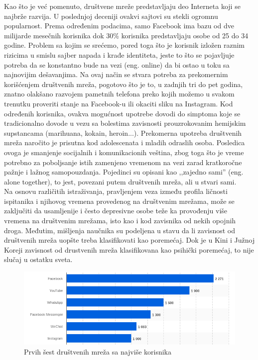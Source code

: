\documentclass[a4paper]{article}
\newtheorem{primer}{Primer}[section]
\begin{document}
\indent\indent Kao što je već pomenuto, društvene mreže predstavljaju deo Interneta koji se najbrže razvija. U poslednjoj deceniji ovakvi sajtovi su stekli ogromnu popularnost. Prema određenim podacima, samo Facebook ima bazu od dve milijarde mesečnih korisnika dok 30\% korisnika predstavljaju osobe od 25 do 34 godine.\cite{socialN} Problem sa kojim se srećemo, pored toga što je korisnik izložen raznim rizicima u smislu sajber napada i krađe identiteta, jeste to što se pojavljuje potreba da se konstantno bude na vezi (eng. online) da bi ostao u toku sa najnovijim dešavanjima. Na ovaj način se stvara potreba za prekomernim korišćenjem društvenih mreža, pogotovo što je to, u zadnjih tri do pet godina, znatno olakšano razvojem pametnih telefona preko kojih možemo u svakom trenutku proveriti stanje na Facebook-u ili okaciti sliku na Instagram. Kod određenih korisnika, ovakva mogućnost upotrebe dovodi do simptoma koje se tradicionalno dovode u vezu sa bolestima zavisnosti prouzrokovanim hemijskim supstancama (marihuana, kokain, heroin...).  \cite{snsa} Prekomerna upotreba društvenih mreža naročito je prisutna kod adolescenata i mladih odraslih osoba. Posledica ovoga je smanjenje socijalnih i komunikacionih veština, zbog toga što je vreme potrebno za poboljsanje istih zamenjeno vremenom na vezi zarad kratkoročne pažnje i lažnog samopouzdanja. Pojedinci su opisani kao ,,zajedno sami'' (eng. alone together), to jest, povezani putem društvenih mreža, ali u stvari sami. \cite{turkle2017alone}
\\
\indent Na osnovu različitih istraživanja, pravljenjem veza između profila ličnosti ispitanika i njihovog vremena provedenog na društvenim mrežama, može se zaključiti da usamljenije i često depresivne osobe teže ka provođenju više vremena na društvenim mrežama, isto kao i kod zavisnika od nekih opojnih droga. Međutim, mišljenja naučnika su podeljena u stavu da li zavisnost od društvenih mreža uopšte treba klasifikovati kao poremećaj. Dok je u Kini i Južnoj Koreji zavisnost od drustvenih mreža klasifikovana kao psihički poremećaj, to nije slučaj u ostatku sveta.
\\
\begin{figure}[h!]
\begin{center}
\includegraphics[scale=0.5]{top_6_networks.png}
\end{center}
\caption{Prvih šest društvenih mreža sa najviše korisnika}
\label{fig:top_networks}
\end{figure}
\end{document}
